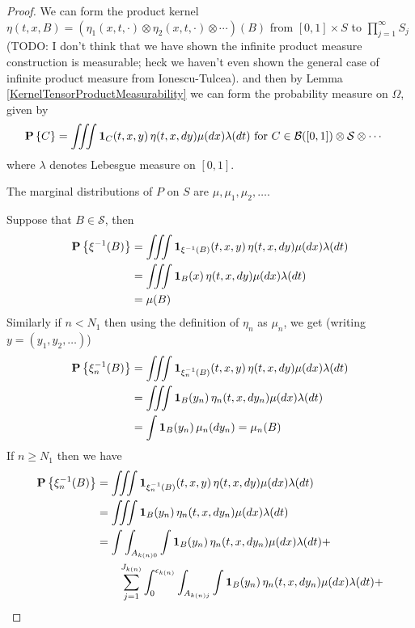 \begin{proof}
We can form the product kernel $\eta(t,x,B) = (\eta_1(x,t, \cdot) \otimes \eta_2(x,t, \cdot) \otimes \dotsb)(B)$ from $[0,1] \times S$ to $\prod_{j=1}^\infty S_j$ (TODO: I don't think that we have shown the infinite product measure construction is measurable; heck we haven't even shown the general case of infinite product measure from Ionescu-Tulcea).  
and then by Lemma \ref{KernelTensorProductMeasurability} we can form the probability measure on $\Omega$, given by
\begin{align*}
\textbf{P}\left \{C \right \} &= \iiint \textbf{1}_{C}(t,x,y) \, \eta(t,x, dy) \mu(dx) \lambda(dt) \text{ for $C \in \mathcal{B}([0,1]) \otimes \mathcal{S} \otimes \dotsb$}
\end{align*} 
where $\lambda$ denotes Lebesgue measure on $[0,1]$.  

\begin{clm} The marginal distributions of $P$ on $S$ are $\mu, \mu_1, \mu_2, \dotsc$.
\end{clm}
Suppose that $B \in \mathcal{S}$, then 
\begin{align*}
\textbf{P}\left \{\xi^{-1}(B) \right \} &= \iiint \textbf{1}_{\xi^{-1}(B)}(t,x,y) \, \eta(t,x, dy) \mu(dx) \lambda(dt) \\
&= \iiint \textbf{1}_{B}(x) \, \eta(t,x, dy) \mu(dx) \lambda(dt) \\
&= \mu(B)
\end{align*}
Similarly if $n < N_1$ then using the definition of $\eta_n$ as $\mu_n$, we get (writing $y = (y_1, y_2, \dotsc)$)
\begin{align*}
\textbf{P}\left \{\xi_n^{-1}(B) \right \} &= \iiint \textbf{1}_{\xi_n^{-1}(B)}(t,x,y) \, \eta(t,x, dy) \mu(dx) \lambda(dt) \\
&= \iiint \textbf{1}_{B}(y_n) \, \eta_n(t,x, dy_n) \mu(dx) \lambda(dt) \\
&= \int \textbf{1}_{B}(y_n) \, \mu_n(dy_n) = \mu_n(B)
\end{align*}
If $n \geq N_1$ then we have
\begin{align*}
\probability{\xi_n^{-1}(B)} &= \iiint \characteristic{\xi_n^{-1}(B)}(t,x,y) \, \eta(t,x, dy) \mu(dx) \lambda(dt) \\
&= \iiint \characteristic{B}(y_n) \, \eta_n(t,x, dy_n) \mu(dx) \lambda(dt) \\
&= \int \int_{A_{k(n)0}} \int \characteristic{B}(y_n) \, \eta_n(t,x, dy_n) \mu(dx) \lambda(dt) + \\
& \qquad \sum_{j=1}^{J_{k(n)}} \int_0^{\epsilon_{k(n)}} \int_{A_{k(n)j}} \int \characteristic{B}(y_n) \, \eta_n(t,x, dy_n) \mu(dx) \lambda(dt) + \\

\end{align*}
\end{proof}
